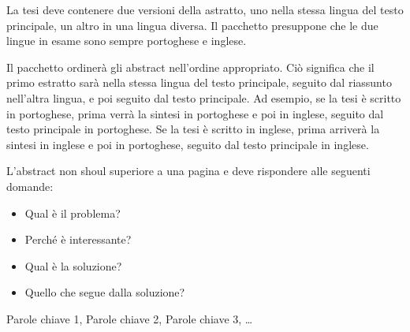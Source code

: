 

La tesi deve contenere due versioni della astratto, uno nella stessa lingua del testo principale, un altro in una lingua diversa. Il pacchetto presuppone che le due lingue in esame sono sempre portoghese e inglese.

Il pacchetto ordinerà gli abstract nell'ordine appropriato. Ciò significa che il primo estratto sarà nella stessa lingua del testo principale, seguito dal riassunto nell'altra lingua, e poi seguito dal testo principale. Ad esempio, se la tesi è scritto in portoghese, prima verrà la sintesi in portoghese e poi in inglese, seguito dal testo principale in portoghese. Se la tesi è scritto in inglese, prima arriverà la sintesi in inglese e poi in portoghese, seguito dal testo principale in inglese.

L'abstract non shoul superiore a una pagina e deve rispondere alle seguenti domande:

\begin{itemize}
\item Qual è il problema?
\item Perché è interessante?
\item Qual è la soluzione?
\item Quello che segue dalla soluzione?
\end{itemize}

\begin{keywords}
Parole chiave 1, Parole chiave 2, Parole chiave 3,  \ldots
\end{keywords} 
